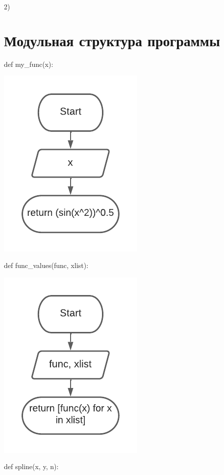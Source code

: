2) \begin{math} 
	[\sqrt{700*\pi}; \sqrt{701*\pi}]
\end{math}

\section{Модульная структура программы}


def my\_func(x):

\includegraphics[scale=0.7]{block1.pdf}

def func\_values(func, xlist):

\includegraphics[scale=0.75]{block2.pdf}

def spline(x, y, n):

